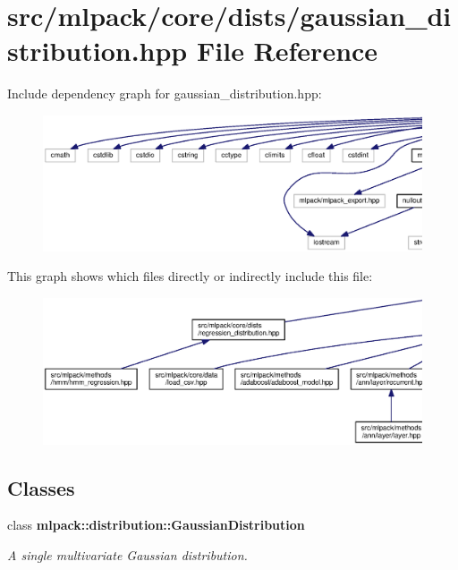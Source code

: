 \section{src/mlpack/core/dists/gaussian\+\_\+distribution.hpp File Reference}
\label{gaussian__distribution_8hpp}
Include dependency graph for gaussian\+\_\+distribution.\+hpp\+:
\nopagebreak
\begin{figure}[H]
\begin{center}
\leavevmode
\includegraphics[width=350pt]{gaussian__distribution_8hpp__incl}
\end{center}
\end{figure}
This graph shows which files directly or indirectly include this file\+:
\nopagebreak
\begin{figure}[H]
\begin{center}
\leavevmode
\includegraphics[width=350pt]{gaussian__distribution_8hpp__dep__incl}
\end{center}
\end{figure}
\subsection*{Classes}
\begin{DoxyCompactItemize}
\item 
class {\bf mlpack\+::distribution\+::\+Gaussian\+Distribution}
\begin{DoxyCompactList}\small\item\em A single multivariate Gaussian distribution. \end{DoxyCompactList}\end{DoxyCompactItemize}
